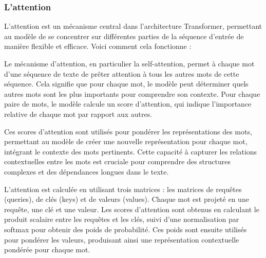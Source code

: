 \subsubsection{L'attention}

L'attention est un mécanisme central dans l'architecture Transformer, permettant au modèle de se concentrer sur différentes parties de la séquence d'entrée de manière flexible et efficace. Voici comment cela fonctionne :

Le mécanisme d'attention, en particulier la self-attention, permet à chaque mot d'une séquence de texte de prêter attention à tous les autres mots de cette séquence. Cela signifie que pour chaque mot, le modèle peut déterminer quels autres mots sont les plus importants pour comprendre son contexte. Pour chaque paire de mots, le modèle calcule un score d'attention, qui indique l'importance relative de chaque mot par rapport aux autres.

Ces scores d'attention sont utilisés pour pondérer les représentations des mots, permettant au modèle de créer une nouvelle représentation pour chaque mot, intégrant le contexte des mots pertinents. Cette capacité à capturer les relations contextuelles entre les mots est cruciale pour comprendre des structures complexes et des dépendances longues dans le texte.

L'attention est calculée en utilisant trois matrices : les matrices de requêtes (queries), de clés (keys) et de valeurs (values). Chaque mot est projeté en une requête, une clé et une valeur. Les scores d'attention sont obtenus en calculant le produit scalaire entre les requêtes et les clés, suivi d'une normalisation par softmax pour obtenir des poids de probabilité. Ces poids sont ensuite utilisés pour pondérer les valeurs, produisant ainsi une représentation contextuelle pondérée pour chaque mot.

